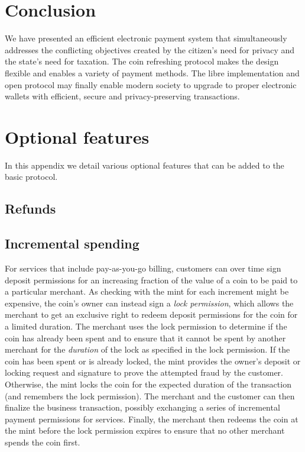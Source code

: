 \documentclass{llncs}
\begin{document}
\section{Conclusion}

We have presented an efficient electronic payment system that
simultaneously addresses the conflicting objectives created by the
citizen's need for privacy and the state's need for taxation.  The
coin refreshing protocol makes the design flexible and enables a
variety of payment methods.  The libre implementation and open
protocol may finally enable modern society to upgrade to proper
electronic wallets with efficient, secure and privacy-preserving
transactions.




\appendix

\section{Optional features}

In this appendix we detail various optional features that can
be added to the basic protocol.

\subsection{Refunds}


\subsection{Incremental spending}

For services that include pay-as-you-go billing, customers can over
time sign deposit permissions for an increasing fraction of the value
of a coin to be paid to a particular merchant.  As checking with the
mint for each increment might be expensive, the coin's owner can
instead sign a {\em lock permission}, which allows the merchant to get
an exclusive right to redeem deposit permissions for the coin for a
limited duration.  The merchant uses the lock permission to determine
if the coin has already been spent and to ensure that it cannot be
spent by another merchant for the {\em duration} of the lock as
specified in the lock permission.  If the coin has been spent or is
already locked, the mint provides the owner's deposit or locking
request and signature to prove the attempted fraud by the customer.
Otherwise, the mint locks the coin for the expected duration of the
transaction (and remembers the lock permission).  The merchant and the
customer can then finalize the business transaction, possibly
exchanging a series of incremental payment permissions for services.
Finally, the merchant then redeems the coin at the mint before the
lock permission expires to ensure that no other merchant spends the
coin first.
\end{document}
